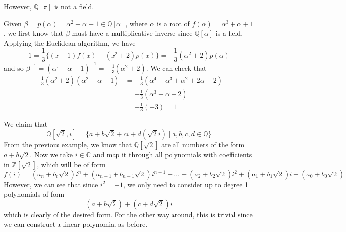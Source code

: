   \begin{example}
    However, $\mathbb{Q}[\pi]$ is not a field. 
  \end{example} 

  \begin{example}
    Given $\beta = p(\alpha) = \alpha^2 + \alpha - 1 \in \mathbb{Q}[\alpha]$, where $\alpha$ is a root of $f(\alpha) = \alpha^3 + \alpha + 1$, we first know that $\beta$ must have a multiplicative inverse since $\mathbb{Q}[\alpha]$ is a field. Applying the Euclidean algorithm, we have 
    \begin{equation}
      1 = \frac{1}{3} \big\{ (x+1) f(x) - (x^2 + 2) p(x)\big\} = -\frac{1}{3} (\alpha^2 + 2) p(\alpha)
    \end{equation}
    and so $\beta^{-1} = (\alpha^2 + \alpha - 1)^{-1} = -\frac{1}{3} (\alpha^2 + 2)$. We can check that 
    \begin{align}
      -\frac{1}{3} (\alpha^2 + 2) (\alpha^2 + \alpha - 1) & = -\frac{1}{3} (\alpha^4 + \alpha^3 + \alpha^2 + 2 \alpha - 2) \\
                                                          & = -\frac{1}{3} (\alpha^3 + \alpha - 2) \\
                                                          & = -\frac{1}{3} (-3) = 1
    \end{align}
  \end{example}

  \begin{example}
    We claim that 
    \begin{equation}
      \mathbb{Q}[\sqrt{2}, i] = \{ a + b \sqrt{2} + ci + d(\sqrt{2} i) \mid a, b, c, d \in \mathbb{Q}\}
    \end{equation}
    From the previous example, we know that $\mathbb{Q}[\sqrt{2}]$ are all numbers of the form $a + b\sqrt{2}$. Now we take $i \in \mathbb{C}$ and map it through all polynomials with coefficients in $\mathbb{Z}[\sqrt{2}]$, which will be of form 
    \begin{equation}
      f(i) = (a_n + b_n \sqrt{2}) i^n + (a_{n-1} + b_{n-1}\sqrt{2}) i^{n-1} + \ldots + (a_2 + b_2 \sqrt{2}) i^2 + (a_1 + b_1 \sqrt{2}) i + (a_0 + b_0 \sqrt{2})
    \end{equation} 
    However, we can see that since $i^2 = -1$, we only need to consider up to degree 1 polynomials of form 
    \begin{equation}
      (a + b \sqrt{2}) + (c + d \sqrt{2}) i 
    \end{equation}
    which is clearly of the desired form. For the other way around, this is trivial since we can construct a linear polynomial as before. 
  \end{example} 

